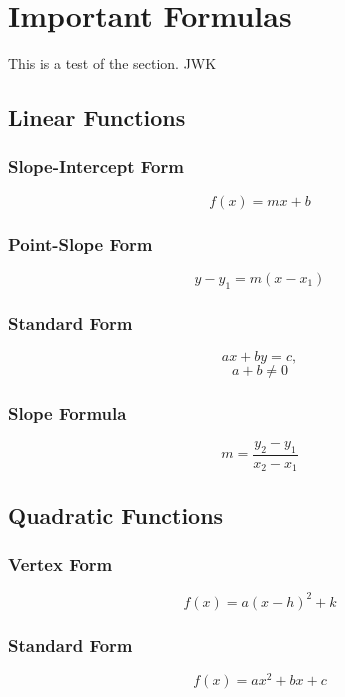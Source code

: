 \chapter{Important Formulas} %

This is a test of the section. JWK

\section{Linear Functions}
\subsection{Slope-Intercept Form}
\begin{equation} 
    f(x) = mx + b
\end{equation}

\subsection{Point-Slope Form}
\begin{equation}
    y-y_1 = m(x - x_1)
\end{equation}
\subsection{Standard Form}
\begin{equation}
    ax+by = c,
\end{equation}
\begin{equation}
    a+b \neq 0 
\end{equation}
\subsection{Slope Formula}
\begin{equation}
    m = \frac{y_2 - y_1}{x_2 - x_1}
\end{equation}

\section{Quadratic Functions}
\subsection{Vertex Form}
\begin{equation}
    f(x) = a(x-h)^2 + k
\end{equation}

\subsection{Standard Form}
\begin{equation}
    f(x) = ax^2 + bx + c
\end{equation}

